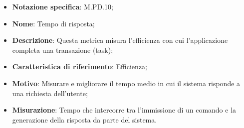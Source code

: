 \begin{itemize}
    \item \textbf{Notazione specifica}: M.PD.10;
    \item \textbf{Nome}: Tempo di risposta;
    \item \textbf{Descrizione}: Questa metrica misura l'efficienza con cui l'applicazione completa una transazione (task);
    \item \textbf{Caratteristica di riferimento}: Efficienza;
    \item \textbf{Motivo}: Misurare e migliorare il tempo medio in cui il sistema risponde a una richiesta dell'utente;
    \item \textbf{Misurazione}: Tempo che intercorre tra l’immissione di un comando e la generazione della risposta da parte del sistema.
\end{itemize}
